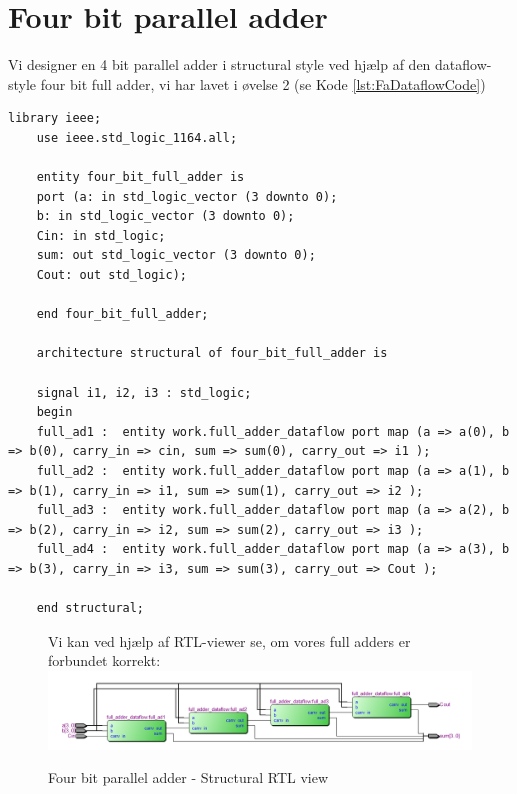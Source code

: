 \section{Four bit parallel adder}
\begin{enumerate}
	\item[1)]
Vi designer en 4 bit parallel adder i structural style ved hjælp af den dataflow-style four bit full adder, vi har lavet i øvelse 2 (se Kode \ref{lst:FaDataflowCode})


	\medskip
	\begin{lstlisting}[caption={Four bit parallel adder Structural VHDL kode},label={lst:4bitFaStructuralCode}]
	library ieee;
	use ieee.std_logic_1164.all;
	
	entity four_bit_full_adder is
	port (a: in std_logic_vector (3 downto 0);
	b: in std_logic_vector (3 downto 0);
	Cin: in std_logic;
	sum: out std_logic_vector (3 downto 0);
	Cout: out std_logic);
	
	end four_bit_full_adder;
	
	architecture structural of four_bit_full_adder is
	
	signal i1, i2, i3 : std_logic;
	begin
	full_ad1 : 	entity work.full_adder_dataflow port map (a => a(0), b => b(0), carry_in => cin, sum => sum(0), carry_out => i1 );
	full_ad2 : 	entity work.full_adder_dataflow port map (a => a(1), b => b(1), carry_in => i1, sum => sum(1), carry_out => i2 );
	full_ad3 : 	entity work.full_adder_dataflow port map (a => a(2), b => b(2), carry_in => i2, sum => sum(2), carry_out => i3 );
	full_ad4 : 	entity work.full_adder_dataflow port map (a => a(3), b => b(3), carry_in => i3, sum => sum(3), carry_out => Cout );
	
	end structural;
	\end{lstlisting}
	
\begin{figure}[H]
	\item[2)]
	Vi kan ved hjælp af RTL-viewer se, om vores full adders er forbundet korrekt:
	\centering
\includegraphics[scale=0.6]{pictures/Oevelse2/four_bit_full_adder_RTLview.jpeg}
\caption{Four bit parallel adder - Structural RTL view}
\label{fig:4bitFaBehavioralRTL}
\end{figure}


\end{enumerate}
